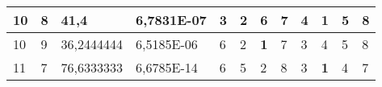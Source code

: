 \documentclass[conference]{IEEEtran}
\begin{document}
\begin{table*}[]
\begin{tabular}{|llll|llllllll|}
\multicolumn{1}{|l|}{10}                                                    & \multicolumn{1}{l|}{8}                                                        & \multicolumn{1}{l|}{41,4}                                                         & 6,7831E-07                     & \multicolumn{1}{l|}{3}                                                  & \multicolumn{1}{l|}{2}                                                  & \multicolumn{1}{l|}{6}                                                  & \multicolumn{1}{l|}{7}                                                  & \multicolumn{1}{l|}{4}                                                  & \multicolumn{1}{l|}{\textbf{1}}                                         & \multicolumn{1}{l|}{5}                                                  & 8                          \\ \hline
\multicolumn{1}{|l|}{10}                                                    & \multicolumn{1}{l|}{9}                                                        & \multicolumn{1}{l|}{36,2444444}                                                   & 6,5185E-06                     & \multicolumn{1}{l|}{6}                                                  & \multicolumn{1}{l|}{2}                                                  & \multicolumn{1}{l|}{\textbf{1}}                                         & \multicolumn{1}{l|}{7}                                                  & \multicolumn{1}{l|}{3}                                                  & \multicolumn{1}{l|}{4}                                                  & \multicolumn{1}{l|}{5}                                                  & 8                          \\ \hline
\multicolumn{1}{|l|}{11}                                                    & \multicolumn{1}{l|}{7}                                                        & \multicolumn{1}{l|}{76,6333333}                                                   & 6,6785E-14                     & \multicolumn{1}{l|}{6}                                                  & \multicolumn{1}{l|}{5}                                                  & \multicolumn{1}{l|}{2}                                                  & \multicolumn{1}{l|}{8}                                                  & \multicolumn{1}{l|}{3}                                                  & \multicolumn{1}{l|}{\textbf{1}}                                         & \multicolumn{1}{l|}{4}                                                  & 7                          \\ \hline

\end{tabular}
\end{table*}
\end{document}
